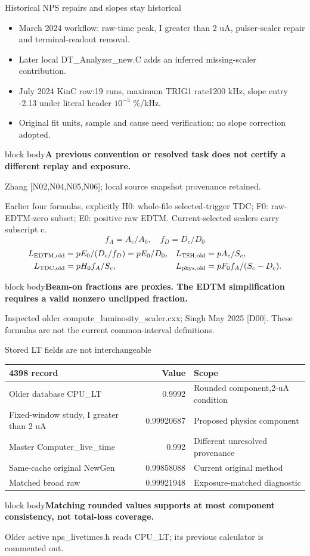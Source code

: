 \documentclass[aspectratio=169,11pt]{beamer}
\newcommand{\source}[1]{\par\vfill{\scriptsize\color{muted}#1\par}}
\newcommand{\takeaway}[1]{\begin{beamercolorbox}[sep=2.5mm,wd=\linewidth]{block body}\textbf{#1}\end{beamercolorbox}}
\begin{document}
\begin{frame}{Historical NPS repairs and slopes stay historical}
\small\begin{itemize}\setlength\itemsep{3mm}
\item March 2024 workflow: raw-time peak, I greater than 2 uA, pulser-scaler repair and terminal-readout removal.
\item Later local DT\_Analyzer\_new.C adds an inferred missing-scaler contribution.
\item July 2024 KinC row:19 runs, maximum TRIG1 rate1200 kHz, slope entry -2.13 under literal header $10^{-5}$ \%/kHz.
\item Original fit units, sample and cause need verification; no slope correction adopted.
\end{itemize}\vspace{3mm}
\takeaway{A previous convention or resolved task does not certify a different replay and exposure.}
\source{Zhang [N02,N04,N05,N06]; local source snapshot provenance retained.}
\end{frame}

\begin{frame}{Earlier four formulas, explicitly}
\small H0: whole-file selected-trigger TDC; F0: raw-EDTM-zero subset;
E0: positive raw EDTM. Current-selected scalers carry subscript c.
\[f_A=A_c/A_0,\quad f_D=D_c/D_0\]
\begin{align*}
L_{\rm EDTM,old}&=pE_0/(D_c/f_D)=pE_0/D_0,&L_{\rm TSH,old}&=pA_c/S_c,\\
L_{\rm TDC,old}&=pH_0f_A/S_c,&L_{\rm phys,old}&=pF_0f_A/(S_c-D_c).
\end{align*}
\takeaway{Beam-on fractions are proxies. The EDTM simplification requires a valid nonzero unclipped fraction.}
\source{Inspected older compute\_luminosity\_scaler.cxx; Singh May 2025 [D00]. These formulas are not the current common-interval definitions.}
\end{frame}

\begin{frame}{Stored LT fields are not interchangeable}
\small\begin{tabular}{@{}lrl@{}}\toprule
4398 record & Value & Scope\\\midrule
Older database CPU\_LT & 0.9992 & Rounded component,2-uA condition\\
Fixed-window study, I greater than 2 uA & 0.99920687 & Proposed physics component\\
Master Computer\_live\_time & 0.992 & Different unresolved provenance\\
Same-cache original NewGen & 0.99858088 & Current original method\\
Matched broad raw & 0.99921948 & Exposure-matched diagnostic\\\bottomrule
\end{tabular}\vspace{4mm}
\takeaway{Matching rounded values supports at most component consistency, not total-loss coverage.}
\source{Older active nps\_livetimes.h reads CPU\_LT; its previous calculator is commented out.}
\end{frame}
\end{document}
